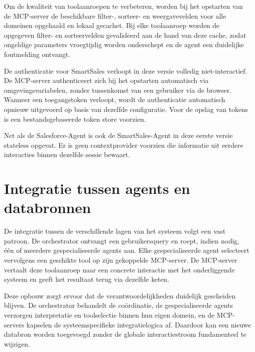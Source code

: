 Om de kwaliteit van toolaanroepen te verbeteren, worden bij het opstarten van de \gls{MCP}-server de beschikbare filter-, sorteer- en weergavevelden voor alle domeinen opgehaald en lokaal gecachet. Bij elke toolaanroep worden de opgegeven filter- en sorteervelden gevalideerd aan de hand van deze cache, zodat ongeldige parameters vroegtijdig worden onderschept en de agent een duidelijke foutmelding ontvangt.

De authenticatie voor SmartSales verloopt in deze versie volledig niet-interactief. De \gls{MCP}-server authenticeert zich bij het opstarten automatisch via omgevingsvariabelen, zonder tussenkomst van een gebruiker via de browser. Wanneer een toegangstoken verloopt, wordt de authenticatie automatisch opnieuw uitgevoerd op basis van dezelfde configuratie. Voor de opslag van tokens is een bestandsgebaseerde token store voorzien.

Net als de Salesforce-Agent is ook de SmartSales-Agent in deze eerste versie stateless opgevat. Er is geen contextprovider voorzien die informatie uit eerdere interacties binnen dezelfde sessie bewaart.




















\section{Integratie tussen agents en databronnen}
\label{sec:integratie}

De integratie tussen de verschillende lagen van het systeem volgt een vast patroon. De orchestrator ontvangt een gebruikersquery en roept, indien nodig, één of meerdere gespecialiseerde agents aan. Elke gespecialiseerde agent selecteert vervolgens een geschikte tool op zijn gekoppelde \gls{MCP}-server. De \gls{MCP}-server vertaalt deze toolaanroep naar een concrete interactie met het onderliggende systeem en geeft het resultaat terug via dezelfde keten.

Deze opbouw zorgt ervoor dat de verantwoordelijkheden duidelijk gescheiden blijven. De orchestrator behandelt de coördinatie, de gespecialiseerde agents verzorgen interpretatie en toolselectie binnen hun eigen domein, en de \gls{MCP}-servers kapselen de systeemspecifieke integratielogica af. Daardoor kan een nieuwe databron worden toegevoegd zonder de globale interactiestroom fundamenteel te wijzigen.

